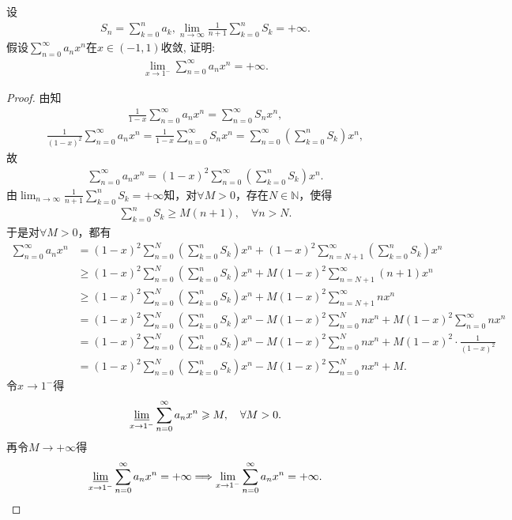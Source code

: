 \documentclass[../../main.tex]{subfiles}%
\begin{document}
\begin{example}
设
\begin{align*}
S_n = \sum_{k=0}^n a_k, \lim_{n \to \infty} \frac{1}{n+1} \sum_{k=0}^n S_k = +\infty.
\end{align*}
假设$\sum_{n=0}^\infty a_n x^n$在$x \in (-1,1)$收敛, 证明:
\begin{align*}
\lim_{x \to 1^-} \sum_{n=0}^\infty a_n x^n = +\infty.
\end{align*}
\end{example}
\begin{proof}

由知
\begin{align*}
\frac{1}{1-x}\sum_{n=0}^{\infty}a_nx^n = \sum_{n=0}^{\infty}S_nx^n,
\end{align*}
\begin{align*}
\frac{1}{(1-x)^2}\sum_{n=0}^{\infty}a_nx^n = \frac{1}{1-x}\sum_{n=0}^{\infty}S_nx^n = \sum_{n=0}^{\infty}\left( \sum_{k=0}^n S_k \right)x^n,
\end{align*}
故
\begin{align*}
\sum_{n=0}^{\infty}a_nx^n = (1-x)^2\sum_{n=0}^{\infty}\left( \sum_{k=0}^n S_k \right)x^n.
\end{align*}
由$\lim_{n \to \infty}\frac{1}{n+1}\sum_{k=0}^n S_k = +\infty$知，对$\forall M>0$，存在$N \in \mathbb{N}$，使得
\begin{align*}
\sum_{k=0}^n S_k \geqslant M(n+1), \quad \forall n>N.
\end{align*}
于是对$\forall M>0$，都有
\begin{align*}
\sum_{n=0}^{\infty}a_nx^n &= (1-x)^2\sum_{n=0}^N\left( \sum_{k=0}^n S_k \right)x^n + (1-x)^2\sum_{n=N+1}^{\infty}\left( \sum_{k=0}^n S_k \right)x^n \\
&\geqslant (1-x)^2\sum_{n=0}^N\left( \sum_{k=0}^n S_k \right)x^n + M(1-x)^2\sum_{n=N+1}^{\infty}(n+1)x^n \\
&\geqslant (1-x)^2\sum_{n=0}^N\left( \sum_{k=0}^n S_k \right)x^n + M(1-x)^2\sum_{n=N+1}^{\infty}nx^n \\
&= (1-x)^2\sum_{n=0}^N\left( \sum_{k=0}^n S_k \right)x^n - M(1-x)^2\sum_{n=0}^N nx^n + M(1-x)^2\sum_{n=0}^{\infty}nx^n \\
&= (1-x)^2\sum_{n=0}^N\left( \sum_{k=0}^n S_k \right)x^n - M(1-x)^2\sum_{n=0}^N nx^n + M(1-x)^2 \cdot \frac{1}{(1-x)^2} \\
&= (1-x)^2\sum_{n=0}^N\left( \sum_{k=0}^n S_k \right)x^n - M(1-x)^2\sum_{n=0}^N nx^n + M.
\end{align*}
令$x \to 1^-$得
\begin{align*}
\varliminf_{x \to 1^-}\sum_{n=0}^{\infty}a_nx^n \geqslant M,\quad \forall M>0.
\end{align*}
再令$M \to +\infty$得
\begin{align*}
\varliminf_{x \to 1^-}\sum_{n=0}^{\infty}a_nx^n = +\infty \Longrightarrow \lim_{x \to 1^-}\sum_{n=0}^{\infty}a_nx^n = +\infty.
\end{align*}

\end{proof}
\end{document}
